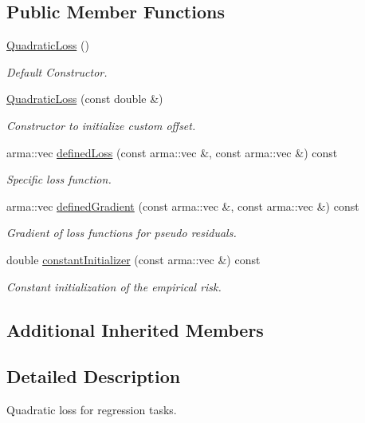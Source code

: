\subsection*{Public Member Functions}
\begin{DoxyCompactItemize}
\item 
\mbox{\hyperlink{classloss_1_1_quadratic_loss_acf4a3be5ab3c3aa4d574748c8864bacd}{Quadratic\+Loss}} ()
\begin{DoxyCompactList}\small\item\em Default Constructor. \end{DoxyCompactList}\item 
\mbox{\hyperlink{classloss_1_1_quadratic_loss_a41fd44734dc6d4f4189e02c79bcf4095}{Quadratic\+Loss}} (const double \&)
\begin{DoxyCompactList}\small\item\em Constructor to initialize custom offset. \end{DoxyCompactList}\item 
arma\+::vec \mbox{\hyperlink{classloss_1_1_quadratic_loss_ae34f68243ffe021e309ed73a68796e1e}{defined\+Loss}} (const arma\+::vec \&, const arma\+::vec \&) const
\begin{DoxyCompactList}\small\item\em Specific loss function. \end{DoxyCompactList}\item 
arma\+::vec \mbox{\hyperlink{classloss_1_1_quadratic_loss_adb4da1acbad702b5ba8570abaa17d373}{defined\+Gradient}} (const arma\+::vec \&, const arma\+::vec \&) const
\begin{DoxyCompactList}\small\item\em Gradient of loss functions for pseudo residuals. \end{DoxyCompactList}\item 
double \mbox{\hyperlink{classloss_1_1_quadratic_loss_a43989f3fbecc27351513afe1136cdf38}{constant\+Initializer}} (const arma\+::vec \&) const
\begin{DoxyCompactList}\small\item\em Constant initialization of the empirical risk. \end{DoxyCompactList}\end{DoxyCompactItemize}
\subsection*{Additional Inherited Members}


\subsection{Detailed Description}
Quadratic loss for regression tasks. 

